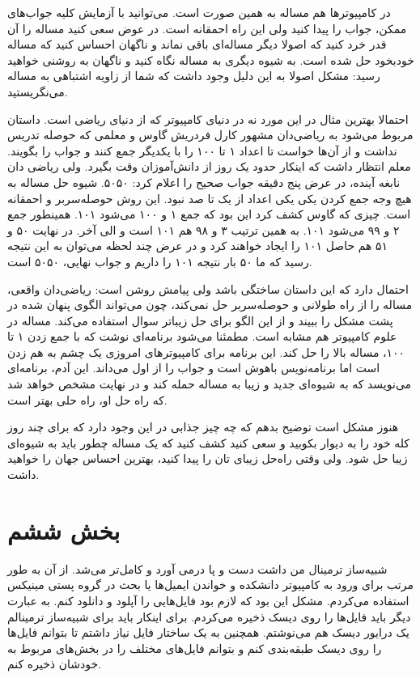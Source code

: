 در کامپیوترها هم مساله به همین صورت است. می‌توانید با آزمایش کلیه
جواب‌های ممکن، جواب را پیدا کنید ولی این راه احمقانه است. در عوض سعی
کنید مساله را آن قدر خرد کنید که اصولا دیگر مساله‌ای باقی نماند و
ناگهان احساس کنید که مساله خودبخود حل شده است. به شیوه دیگری به مساله
نگاه کنید و ناگهان به روشنی خواهید رسید: مشکل اصولا به این دلیل وجود
داشت که شما از زاویه اشتباهی به مساله می‌نگریستید.

احتمالا بهترین مثال در این مورد نه در دنیای کامپیوتر که از دنیای ریاضی
است. داستان مربوط می‌شود به ریاضی‌دان مشهور کارل فردریش گاوس و معلمی که
حوصله تدریس نداشت و از آن‌ها خواست تا اعداد ۱ تا ۱۰۰ را با یکدیگر جمع
کنند و جواب را بگویند. معلم انتظار داشت که اینکار حدود یک روز از
دانش‌آموزان وقت بگیرد. ولی ریاضی دان نابغه آینده، در عرض پنج دقیقه جواب
صحیح را اعلام کرد: ۵۰۵۰. شیوه حل مساله به هیچ وجه جمع کردن یکی یکی
اعداد از یک تا صد نبود. این روش حوصله‌سربر و احمقانه است. چیزی که گاوس
کشف کرد این بود که جمع ۱ و ۱۰۰ می‌شود ۱۰۱. همینطور جمع ۲ و ۹۹ می‌شود
۱۰۱. به همین ترتیب ۳ و ۹۸ هم ۱۰۱ است و الی آخر.  در نهایت ۵۰ و ۵۱ هم
حاصل ۱۰۱ را ایجاد خواهند کرد و در عرض چند لحظه می‌توان به این نتیجه
رسید که ما ۵۰ بار نتیجه ۱۰۱ را داریم و جواب نهایی، ۵۰۵۰ است.

احتمال دارد که این داستان ساختگی باشد ولی پیامش روشن است: ریاضی‌دان
واقعی،‌ مساله را از راه طولانی و حوصله‌سربر حل نمی‌کند، چون می‌تواند الگوی
پنهان شده در پشت مشکل را ببیند و از این الگو برای حل زیباتر سوال
استفاده می‌کند. مساله در علوم کامپیوتر هم مشابه است. مطمئنا می‌شود
برنامه‌ای نوشت که با جمع زدن ۱ تا ۱۰۰، مساله بالا را حل کند. این برنامه
برای کامپیوترهای امروزی یک چشم به هم زدن است اما برنامه‌نویس باهوش است
و جواب را از اول می‌داند. این آدم، برنامه‌ای می‌نویسد که به شیوه‌ای جدید و
زیبا به مساله حمله کند و در نهایت مشخص خواهد شد که راه حل او، راه حلی
بهتر است.

هنوز مشکل است توضیح بدهم که چه چیز جذابی در این وجود دارد که برای چند
روز کله خود را به دیوار بکوبید و سعی کنید کشف کنید که یک مساله چطور
باید به شیوه‌ای زیبا حل شود. ولی وقتی راه‌حل زیبای تان را پیدا کنید،
بهترین احساس جهان را خواهید داشت.

\section{بخش ششم}
شبیه‌ساز ترمینال من داشت دست و پا در‌می آورد و کامل‌تر می‌شد. از آن به طور
مرتب برای ورود به کامپیوتر دانشکده و خواندن ایمیل‌ها یا بحث در گروه
پستی مینیکس استفاده می‌کردم. مشکل این بود که لازم بود فایل‌هایی را آپلود
و دانلود کنم. به عبارت دیگر باید فایل‌ها را روی دیسک ذخیره می‌کردم. برای
اینکار باید برای شبیه‌ساز ترمینالم یک درایور دیسک هم می‌نوشتم. همچنین به
یک ساختار فایل نیاز داشتم تا بتوانم فایل‌ها را روی دیسک طبقه‌بندی کنم و
بتوانم فایل‌های مختلف را در بخش‌های مربوط به خودشان ذخیره کنم.

